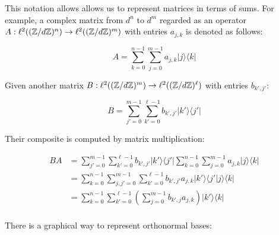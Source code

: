 This notation allows allows us to represent matrices in terms of sums.  For example, a complex matrix from $d^n$ to $d^m$ regarded as an operator $A:\ell^2((\mathbb{Z}/d\mathbb{Z})^n)\to \ell^2((\mathbb{Z}/d\mathbb{Z})^m)$ with entries $a_{j,k}$ is denoted as follows:

$$
A  = \sum_{k=0}^{n-1} \sum_{j=0}^{m-1} a_{j,k}| j \rangle \langle k |
$$

Given another matrix $B:\ell^2((\mathbb{Z}/d\mathbb{Z})^m)\to \ell^2((\mathbb{Z}/d\mathbb{Z})^\ell)$ with entries $b_{k',j'}$:

$$
B  = \sum_{j'=0}^{m-1}\sum_{k'=0}^{\ell-1}  b_{k',j'}| k' \rangle \langle j' |
$$

Their composite is computed by matrix multiplication:

\begin{align*}
BA
  &=  \sum_{j'=0}^{m-1}\sum_{k'=0}^{\ell-1}  b_{k',j'}| k' \rangle \langle j' | \sum_{k=0}^{n-1} \sum_{j=0}^{m-1} a_{j,k}| j \rangle \langle k |\\
&= \sum_{k=0}^{n-1} \sum_{j,j'=0}^{m-1}\sum_{k'=0}^{\ell-1}  b_{k',j'}a_{j,k}| k' \rangle \langle j' | j \rangle \langle k |\\
&= \sum_{k=0}^{n-1} \sum_{k'=0}^{\ell-1} \left(\sum_{j=0}^{m-1} b_{k',j}a_{j,k}\right)| k' \rangle \langle k |\\
\end{align*}


There is a graphical way to represent orthonormal bases:

